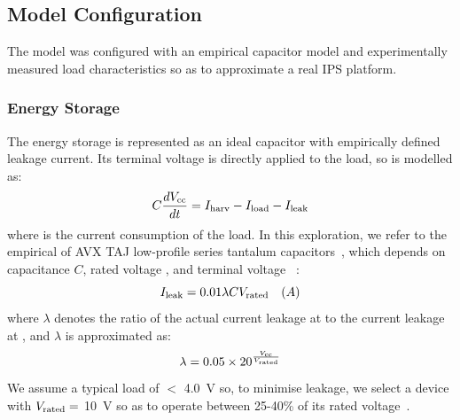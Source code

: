 \subsection{Model Configuration}

The model was configured with an empirical capacitor model and experimentally measured load characteristics so as to approximate a real IPS platform. 

\subsubsection{Energy Storage} \label{ssubsec:estor_model}

The energy storage is represented as an ideal capacitor with empirically defined leakage current. 
Its terminal voltage is directly applied to the load, so is modelled as:
\begin{equation}
  C \frac{dV_{\text{cc}}}{dt} = I_{\text{harv}} - I_{\text{load}} - I_{\text{leak}}
\end{equation}
where  is the current consumption of the load. 
In this exploration, we refer to the empirical  of AVX TAJ low-profile series tantalum capacitors~\cite{tancap1}, which depends on capacitance $C$, rated voltage , and terminal voltage ~\cite{avxleakage}:
\begin{equation}
    I_{\text{leak}} = 0.01 \lambda C V_{\text{rated}} \quad (A)
\end{equation}
where $\lambda$ denotes the ratio of the actual current leakage at  to the current leakage at , and $\lambda$ is approximated as: 
\begin{equation}
    \lambda = 0.05 \times 20^{\frac{V_{\text{cc}}}{V_{\text{rated}}}}
\end{equation}
We assume a typical load of $<$ \SI{4.0}{\volt} so, to minimise leakage, we select a device with $V_{\text{rated}} =$ \SI{10}{\volt} so as to operate between 25-40\% of its rated voltage~\cite{avxleakage}. 


